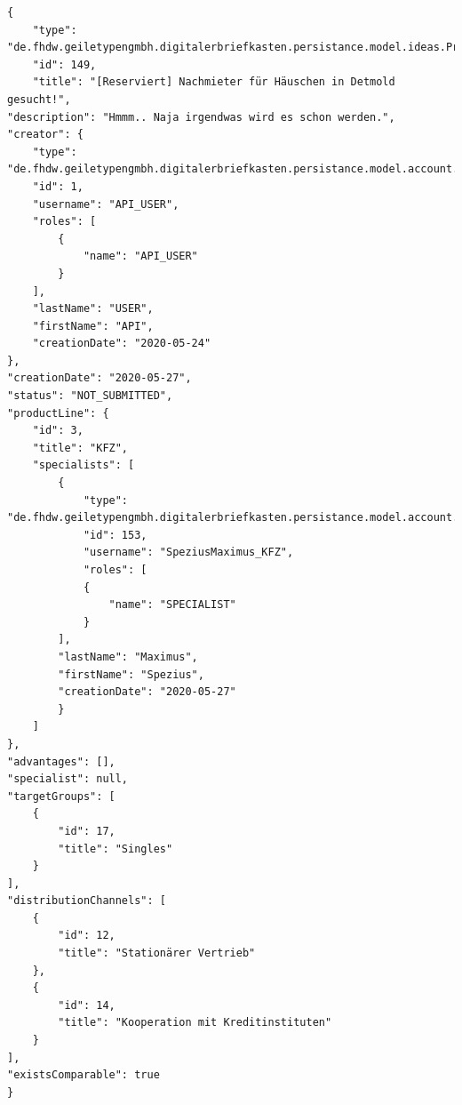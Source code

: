 \label{Anhang_Schnittstellen_2}
\begin{verbatim}
{
    "type": "de.fhdw.geiletypengmbh.digitalerbriefkasten.persistance.model.ideas.ProductIdea",
    "id": 149,
    "title": "[Reserviert] Nachmieter für Häuschen in Detmold gesucht!",
"description": "Hmmm.. Naja irgendwas wird es schon werden.",
"creator": {
    "type": "de.fhdw.geiletypengmbh.digitalerbriefkasten.persistance.model.account.User",
    "id": 1,
    "username": "API_USER",
    "roles": [
        {
            "name": "API_USER"
        }
    ],
    "lastName": "USER",
    "firstName": "API",
    "creationDate": "2020-05-24"
},
"creationDate": "2020-05-27",
"status": "NOT_SUBMITTED",
"productLine": {
    "id": 3,
    "title": "KFZ",
    "specialists": [
        {
            "type": "de.fhdw.geiletypengmbh.digitalerbriefkasten.persistance.model.account.Specialist",
            "id": 153,
            "username": "SpeziusMaximus_KFZ",
            "roles": [
            {
                "name": "SPECIALIST"
            }
        ],
        "lastName": "Maximus",
        "firstName": "Spezius",
        "creationDate": "2020-05-27"
        }
    ]
},
"advantages": [],
"specialist": null,
"targetGroups": [
    {
        "id": 17,
        "title": "Singles"
    }
],
"distributionChannels": [
    {
        "id": 12,
        "title": "Stationärer Vertrieb"
    },
    {
        "id": 14,
        "title": "Kooperation mit Kreditinstituten"
    }
],
"existsComparable": true
}
\end{verbatim}





